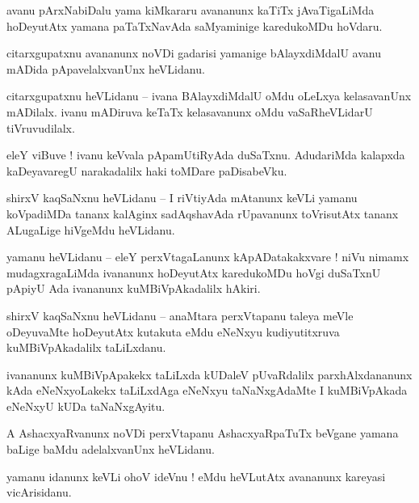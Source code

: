 \documentclass{article}
\begin{document}
\begin{mn}%
avanu pArxNabiDalu yama kiMkararu avananunx kaTiTx jAvaTigaLiMda hoDeyutAtx yamana paTaTxNavAda 
saMyaminige karedukoMDu hoVdaru.
\end{mn}

\begin{mn}%
citarxgupatxnu avananunx noVDi gadarisi yamanige bAlayxdiMdalU avanu mADida pApavelalxvanUnx 
heVLidanu.
\end{mn}

\begin{mn}%
citarxgupatxnu heVLidanu -- ivana BAlayxdiMdalU oMdu oLeLxya kelasavanUnx mADilalx. ivanu mADiruva 
keTaTx kelasavanunx oMdu vaSaRheVLidarU tiVruvudilalx.
\end{mn}

\begin{mn}%
eleY viBuve ! ivanu keVvala pApamUtiRyAda duSaTxnu. AdudariMda kalapxda kaDeyavaregU narakadalilx 
haki toMDare paDisabeVku.
\end{mn}

\begin{mn}%
shirxV kaqSaNxnu heVLidanu -- I riVtiyAda mAtanunx keVLi yamanu koVpadiMDa tananx kalAginx 
sadAqshavAda rUpavanunx toVrisutAtx tananx ALugaLige hiVgeMdu heVLidanu.
\end{mn}

\begin{mn}%
yamanu heVLidanu -- eleY perxVtagaLanunx kApADatakakxvare ! niVu nimamx mudagxragaLiMda ivananunx 
hoDeyutAtx karedukoMDu hoVgi duSaTxnU pApiyU Ada ivananunx kuMBiVpAkadalilx hAkiri.
\end{mn}

\begin{mn}%
shirxV kaqSaNxnu heVLidanu -- anaMtara perxVtapanu taleya meVle oDeyuvaMte hoDeyutAtx kutakuta 
eMdu eNeNxyu kudiyutitxruva kuMBiVpAkadalilx taLiLxdanu.
\end{mn}

\begin{mn}%
ivananunx kuMBiVpApakekx taLiLxda kUDaleV pUvaRdalilx parxhAlxdananunx kAda eNeNxyoLakekx 
taLiLxdAga eNeNxyu taNaNxgAdaMte I kuMBiVpAkada eNeNxyU kUDa taNaNxgAyitu.
\end{mn}

\begin{mn}%
A AshacxyaRvanunx noVDi perxVtapanu AshacxyaRpaTuTx beVgane yamana baLige baMdu adelalxvanUnx 
heVLidanu.
\end{mn}

\begin{mn}%
yamanu idanunx keVLi ohoV ideVnu ! eMdu heVLutAtx avananunx kareyasi vicArisidanu.
\end{mn}
\end{document}
